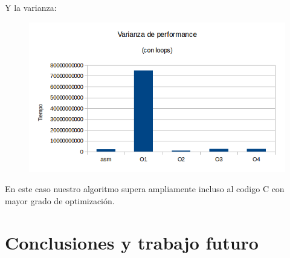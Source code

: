 \documentclass[a4paper]{article}
\begin{document}
Y la varianza:

\begin{figure}[h!]
  \begin{center}
  \includegraphics[scale=0.66]{Graficos1.4/ban/VSO.png}
  \label{nombreparareferenciar12}
  \end{center}
\end{figure}

En este caso nuestro algoritmo supera ampliamente incluso al codigo C con mayor grado de optimización.


\section{Conclusiones y trabajo futuro}
\end{document}
